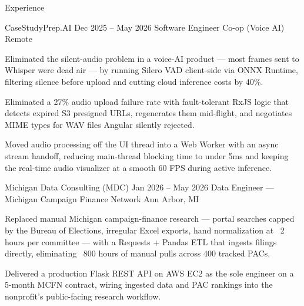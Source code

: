 \documentclass[
	11pt
]{../../../template}
\begin{document}
\begin{rSection}{E}{xperience}
		\begin{rSectionEntry}
			{CaseStudyPrep.AI}
			{Dec 2025 -- May 2026}
			{Software Engineer Co-op (Voice AI)}
			{}
			{Remote}

			\item Eliminated the silent-audio problem in a voice-AI product --- most frames sent to Whisper were dead air --- by running Silero VAD client-side via ONNX Runtime, filtering silence before upload and cutting cloud inference costs by 40\%.
			\item Eliminated a 27\% audio upload failure rate with fault-tolerant RxJS logic that detects expired S3 presigned URLs, regenerates them mid-flight, and negotiates MIME types for WAV files Angular silently rejected.
			\item Moved audio processing off the UI thread into a Web Worker with an async stream handoff, reducing main-thread blocking time to under 5ms and keeping the real-time audio visualizer at a smooth 60 FPS during active inference.
		\end{rSectionEntry}

		\begin{rSectionEntry}
			{Michigan Data Consulting (MDC)}
			{Jan 2026 -- May 2026}
			{Data Engineer --- Michigan Campaign Finance Network}
			{}
			{Ann Arbor, MI}

			\item Replaced manual Michigan campaign-finance research --- portal searches capped by the Bureau of Elections, irregular Excel exports, hand normalization at ~2 hours per committee --- with a Requests + Pandas ETL that ingests filings directly, eliminating ~800 hours of manual pulls across 400 tracked PACs.
			\item Delivered a production Flask REST API on AWS EC2 as the sole engineer on a 5-month MCFN contract, wiring ingested data and PAC rankings into the nonprofit's public-facing research workflow.
		\end{rSectionEntry}
	\end{rSection}
\end{document}
